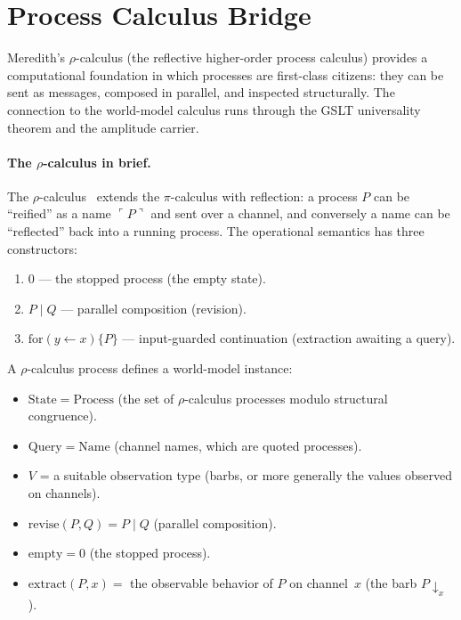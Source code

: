 \section{Process Calculus Bridge}
\label{sec:bridge-process}

Meredith's $\rho$-calculus (the reflective higher-order process
calculus) provides a computational foundation in which processes are
first-class citizens: they can be sent as messages, composed in
parallel, and inspected structurally.  The connection to the
world-model calculus runs through the GSLT universality theorem
and the amplitude carrier.

\paragraph{The $\rho$-calculus in brief.}
The $\rho$-calculus~\cite{MeredithRadestock2005} extends the
$\pi$-calculus with reflection: a process $P$ can be ``reified'' as
a name $\ulcorner P \urcorner$ and sent over a channel, and
conversely a name can be ``reflected'' back into a running process.
The operational semantics has three constructors:
\begin{enumerate}
\item $0$ --- the stopped process (the empty state).
\item $P \mid Q$ --- parallel composition (revision).
\item $\mathrm{for}(y \leftarrow x)\{P\}$ --- input-guarded
  continuation (extraction awaiting a query).
\end{enumerate}

\begin{definition}
\label{def:rho-wm}
A $\rho$-calculus process defines a world-model instance:
\begin{itemize}
\item $\mathrm{State} = \mathrm{Process}$ (the set of
  $\rho$-calculus processes modulo structural congruence).
\item $\mathrm{Query} = \mathrm{Name}$ (channel names, which are
  quoted processes).
\item $V$ = a suitable observation type (barbs, or more generally
  the values observed on channels).
\item $\mathrm{revise}(P, Q) = P \mid Q$ (parallel composition).
\item $\mathrm{empty} = 0$ (the stopped process).
\item $\mathrm{extract}(P, x) = $ the observable behavior of $P$
  on channel~$x$ (the barb $P \downarrow_x$).
\end{itemize}
\end{definition}

